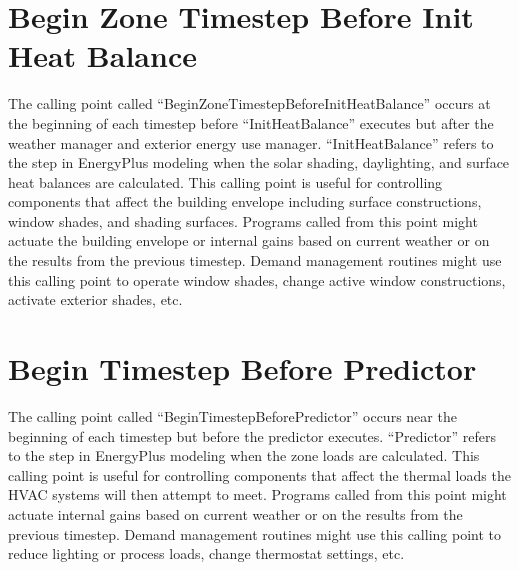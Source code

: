 \section{Begin Zone Timestep Before Init Heat Balance}\label{begin-timestep-before-predictor}

The calling point called ``BeginZoneTimestepBeforeInitHeatBalance'' occurs at the beginning of each timestep before ``InitHeatBalance'' executes but after the weather manager and exterior energy use manager. ``InitHeatBalance'' refers to the step in EnergyPlus modeling when the solar shading, daylighting, and surface heat balances are calculated. This calling point is useful for controlling components that affect the building envelope including surface constructions, window shades, and shading surfaces. Programs called from this point might actuate the building envelope or internal gains based on current weather or on the results from the previous timestep. Demand management routines might use this calling point to operate window shades, change active window constructions, activate exterior shades, etc.

\section{Begin Timestep Before Predictor}\label{begin-timestep-before-predictor}

The calling point called ``BeginTimestepBeforePredictor'' occurs near the beginning of each timestep but before the predictor executes. ``Predictor'' refers to the step in EnergyPlus modeling when the zone loads are calculated. This calling point is useful for controlling components that affect the thermal loads the HVAC systems will then attempt to meet. Programs called from this point might actuate internal gains based on current weather or on the results from the previous timestep. Demand management routines might use this calling point to reduce lighting or process loads, change thermostat settings, etc.
